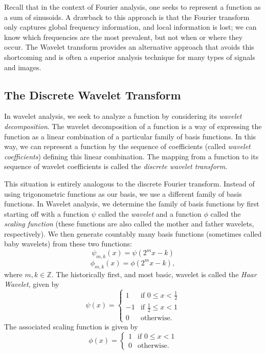 

Recall that in the context of Fourier analysis, one seeks to represent a
function as a sum of sinusoids.
A drawback to this approach is that the
Fourier transform only captures global frequency information, and local
information is lost; we can know which frequencies are the
most prevalent, but not when or where they occur.
The Wavelet transform provides an alternative approach that avoids this shortcoming
and is often a superior analysis technique for many types of signals and images.

\subsection*{The Discrete Wavelet Transform}
In wavelet analysis, we seek to analyze a function by considering its \emph{wavelet decomposition}.
The wavelet decomposition of a function is a way of expressing the function as a linear combination
of a particular family of basis functions.
In this way, we can represent a function by the sequence of coefficients (called
\emph{wavelet coefficients}) defining this linear combination.
The mapping from a function to its sequence of wavelet coefficients is called the \emph{discrete
wavelet transform}.

This situation is entirely analogous to the discrete Fourier transform. Instead of using trigonometric functions
as our basis, we use a different family
of basis functions. In Wavelet analysis, we determine the family of basis functions by first starting
off with a function $\psi$ called the \emph{wavelet} and a function $\phi$ called the \emph{scaling function}
(these functions are also called the mother and father wavelets, respectively). We then generate
countably many basis functions (sometimes called baby wavelets) from these two functions:
\begin{equation*}
\psi_{m,k}(x) = \psi(2^mx - k)
\end{equation*}
\begin{equation*}
\phi_{m,k}(x) = \phi(2^mx - k),
\end{equation*}
where $m,k \in \mathbb{Z}$.
The historically first, and most basic, wavelet is called the \emph{Haar Wavelet},
given by
\[
\psi(x) =
 \begin{cases}
  1 & \text{if } 0 \leq x < \frac{1}{2} \\
  -1 & \text{if } \frac{1}{2} \leq x < 1 \\
  0 & \text{otherwise.}
 \end{cases}
\]
The associated scaling function is given by
\[
\phi(x) =
 \begin{cases}
 1 & \text{if } 0 \leq x < 1 \\
 0 & \text{otherwise.}
 \end{cases}
\]


